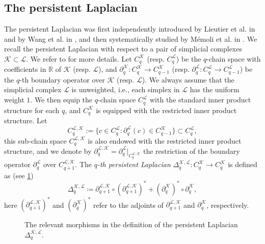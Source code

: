 \documentclass{article}
\newcommand{\R}{\mathbb{R}}
\newcommand{\KK}{\mathcal{K}}
\newcommand{\LL}{\mathcal{L}}
\begin{document}
\subsection{The persistent Laplacian}
The persistent Laplacian was first independently introduced by Lieutier et al. in \cite{lapslides} and by Wang et al. in \cite{MR4164275}, 
and then systematically studied by M\'{e}moli et al. in \cite{pers_lap}.
We recall the persistent Laplacian with respect to a pair of simplicial complexes $\KK\subset \LL$.
We refer to \cite{MR4164275, pers_lap} for more details.
Let $C_q^\KK$ (resp. $C_q^\LL$) be the $q$-chain space with coefficients in $\R$ of $\KK$ (resp. $\LL$), 
and $\partial_{q}^\KK: C_q^\KK\to C_{q-1}^\KK$ (resp. $\partial_{q}^\LL: C_q^\LL\to C_{q-1}^\LL$) be the $q$-th boundary operator over $\KK$ (resp. $\LL$).
We always assume that the simplicial complex $\LL$ is unweighted,
i.e.,
each simplex in $\LL$ has the uniform weight $1$.
We then equip the $q$-chain space $C_q^\LL$ with the standard inner product structure for each $q$,
and $C_q^\KK$ is equipped with the restricted inner product structure.
Let 
\[C_q^{\LL, \KK}:= \{c\in C_q^\LL: \partial_q^\LL(c)\in C_{q-1}^\KK\}\subset C_q^\LL,\]
this sub-chain space $C_q^{\LL, \KK}$ is also endowed with the restricted inner product structure, 
and we denote by $\partial_{q}^{\LL, \KK}=\partial_{q}^\LL\big|_{C_{q}^{\LL, \KK}}$ the restriction of the boundary operator $\partial_{q}^\LL$ over $C_{q+1}^{\LL, \KK}$.
The \emph{$q$-th persistent Laplacian} $\Delta_{q}^{\KK, \LL}: C_q^\KK\to C_q^\KK$ is defined as (see \cref{fig_dig_per_lap})
\[
 \Delta_{q}^{\KK, \LL}\coloneqq \partial_{q+1}^{\LL, \KK}\circ \left(\partial_{q+1}^{\LL, \KK}\right)^\ast +
 \left(\partial_q^\KK\right)^\ast \circ \partial_q^\KK,
\]
here $\left(\partial_{q+1}^{\LL, \KK}\right)^\ast$ and $\left(\partial_q^\KK\right)^\ast$ refer to the adjoints of $\partial_{q+1}^{\LL, \KK}$ and $\partial_q^\KK$, respectively. 

\begin{figure}
\centering
{}
\caption{The relevant morphisms in the definition of the persistent Laplacian $\Delta_{q}^{\KK, \LL}$.}
\label{fig_dig_per_lap}
\end{figure}
\end{document}
